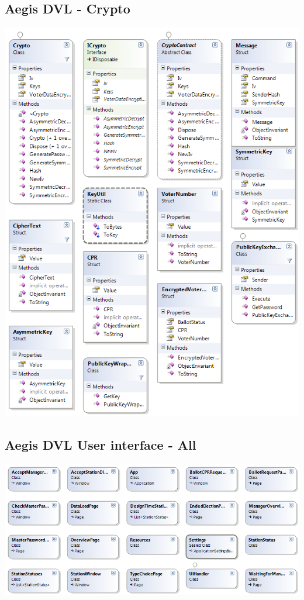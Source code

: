 \documentclass[a4paper]{report}
\begin{document}
\subsection*{ Aegis DVL - Crypto}
\begin{center}
\includegraphics[width=\textwidth]{DVLClassdiagram_Crypto.png}
\end{center}
\subsection*{ Aegis DVL User interface - All}
\begin{center}
\includegraphics[width=\textwidth]{UIClassdiagram_All.png}
\end{center}
\end{document}
